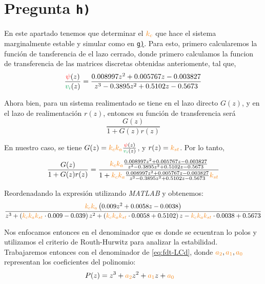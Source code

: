 \section{Pregunta \texttt{h)}}\label{pregunta-h}


En este apartado tenemos que determinar el $\nara{k_c}$  que hace el sistema
marginalmente estable y simular como en \hyperref[pregunta-g]{\texttt{g)}}. Para
esto, primero calcularemos la función de tansferencia de el lazo cerrado, donde
primero calculamos la funcion de transferencia de las matrices discretas obtenidas
anteriomente, tal que,
\begin{equation}
   \frac{\rojo{\psi}(z)}{\verd{v_{i}}(z)} = \frac{0.008997z^2 + 0.005767 z - 0.003827}
    {z^3 - 0.3895 z^2 + 0.5102 z -0.5673}
\end{equation}

Ahora bien, para un sistema realimentado se tiene en el lazo directo $G(z)$, y 
en el lazo de realimentación $r(z)$, entonces su función de transferencia será
\begin{equation}
    \frac{G(z)}{1 + G(z)r(z)}
\end{equation}

En nuestro caso, se tiene $G(z) = \nara{k_{c} k_{a}} \frac{\rojo{\psi}(z)}{\verd{v_i}(z)}$,
y $r(z) = \nara{k_{st}}$. Por lo tanto,
\begin{equation}
    \frac{G(z)}{1 + G(z)r(z)} = \dfrac{\nara{k_ck_a} \frac{0.008997z^2 + 0.005767 z - 0.003827}
    {z^3 - 0.3895 z^2 + 0.5102 z -0.5673}}
    {1+\nara{k_ck_a} \frac{0.008997z^2 + 0.005767 z - 0.003827}
    {z^3 - 0.3895 z^2 + 0.5102 z -0.5673}\nara{k_{st}}}
\end{equation}

Reordenadando la expresión utilizando \textit{MATLAB} y obtenemos:
\begin{equation}\label{eq:fdt-LCd}
    \frac{ \nara{k_c k_a} \left( 0.009 z^2 + 0.0058 z - 0.0038 \right)}
    { z^3 + \left( \nara{k_c k_a k_{st}} \cdot 0.009 - 0.039 \right) z^2 
    + \left( \nara{k_c k_a k_{st}} \cdot 0.0058 + 0.5102 \right) z 
    - \nara{k_c k_a k_{st}} \cdot 0.0038 + 0.5673 }
\end{equation}

Nos enfocamos entonces en el denominador que es donde se ecuentran lo polos y
utilizamos el criterio de Routh-Hurwitz para analizar la estabilidad. 
Trabajaremos entonces con el denominador de \eqref{eq:fdt-LCd}, donde $\nara{a_2},\nara{a_1},\nara{a_0}$
representan los coeficientes del polinomio:
\begin{align}
    P(z) =  z^3 + \nara{a_2} z^2 + \nara{a_1} z + \nara{a_0} &
\end{align}

